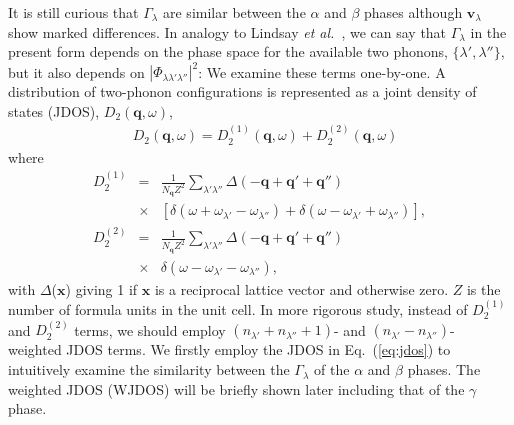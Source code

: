 \documentclass[twocolumn,amsmath,amssymb,a4paper,prb,superscriptaddress,floatfix]{revtex4-1}
\begin{document}
It is still curious that $\Gamma_\lambda$ are similar between the $\alpha$ and
$\beta$ phases although $\mathbf{v}_\lambda$ show marked differences.
%
%
In analogy to Lindsay {\it et al.}~\cite{Lindsay}, we can say that
$\Gamma_\lambda$ in the present form depends on the phase space for the
available two phonons, $\{\lambda', \lambda''\}$, but it also depends on
$|\Phi_{\lambda\lambda'\lambda''}|^2$: We examine these terms one-by-one. A
distribution of two-phonon configurations is represented as a joint density of
states (JDOS),
${D_2(\mathbf{q},\omega)}$,  
\begin{align}
 \label{eq:jdos}
 &D_2(\mathbf{q},\omega) = D_2^{(1)}(\mathbf{q},\omega) +  D_2^{(2)}(\mathbf{q},\omega)
\end{align}
where 
\begin{eqnarray*}
	D_2^{(1)} & = & \frac{1}{N_\mathbf{q}Z^2} \sum_{\lambda'\lambda''}\Delta(-\mathbf{q} + \mathbf{q'} + \mathbf{q''}) \nonumber \\
								   & \times & [\delta(\omega + \omega_{\lambda'} - \omega_{\lambda''}) + \delta(\omega - \omega_{\lambda'} + \omega_{\lambda''})],\\
	D_2^{(2)} & = & \frac{1}{N_\mathbf{q}Z^2} \sum_{\lambda'\lambda''}\Delta(-\mathbf{q} + \mathbf{q'} + \mathbf{q''}) \nonumber \\
								   & \times & \delta(\omega - \omega_{\lambda'} - \omega_{\lambda''}),
\end{eqnarray*}
with $\Delta$($\mathbf{x}$) giving 1 if $\mathbf{x}$ is a reciprocal lattice
vector and otherwise zero. $Z$ is the number of formula units in the unit cell.
In more rigorous study, instead of $D_2^{(1)}$ and $D_2^{(2)}$ terms, we should
employ  $(n_{\lambda'}+n_{\lambda''}+1)$- and $(n_{\lambda'}-n_{\lambda''})$-
weighted JDOS terms.  We firstly employ the JDOS in Eq.~(\ref{eq:jdos}) to
intuitively examine the similarity between the $\Gamma_{\lambda}$ of the
$\alpha$ and $\beta$ phases. The weighted JDOS (WJDOS) will be briefly shown
later including that of the $\gamma$ phase. 
\end{document}
